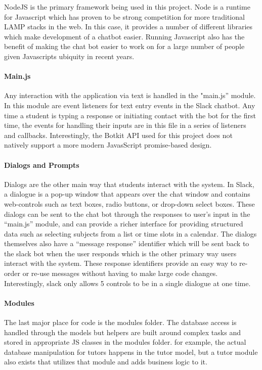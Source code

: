 NodeJS is the primary framework being used in this project.  Node is a runtime
for Javascript which has proven to be strong competition for more traditional
LAMP stacks in the web.  In this case, it provides a number of different
libraries which make development of a chatbot easier.  Running Javascript also
has the benefit of making the chat bot easier to work on for a large number of
people given Javascripts ubiquity in recent years.

\paragraph{Main.js}
Any interaction with the application via text is handled in the "main.js''
module. In this module are event listeners for text entry events in the Slack
chatbot.  Any time a student is typing a response or initiating contact with the
bot for the first time, the events for handling their inputs are in this file in
a series of listeners and callbacks.  Interestingly, the Botkit API used for
this project does not natively support a more modern JavasScript promise-based
design.

\paragraph{Dialogs and Prompts}
Dialogs are the other main way that students interact with the system.  In
Slack, a dialogue is a pop-up window that appears over the chat window and
contains web-controls such as text boxes, radio buttons, or drop-down select
boxes. These dialogs can be sent to the chat bot through the responses to user's
input in the ``main.js'' module, and can provide a richer interface for
providing structured data such as selecting subjects from a list or time slots
in a calendar.  The dialogs themselves also have a ``message response''
identifier which will be sent back to the slack bot when the user responds
which is the other primary way users interact with the system.  These response
identifiers provide an easy way to re-order or re-use messages without having to
make large code changes.  %
Interestingly, slack only allows 5 controls to be in a single dialogue at one
time.  

\paragraph{Modules}
The last major place for code is the modules folder.  The database access is
handled through the models but helpers are built around complex tasks and stored
in appropriate JS classes in the modules folder.  for example, the actual
database manipulation for tutors happens in the tutor model, but a tutor module
also exists that utilizes that module and adds business logic to it.  


